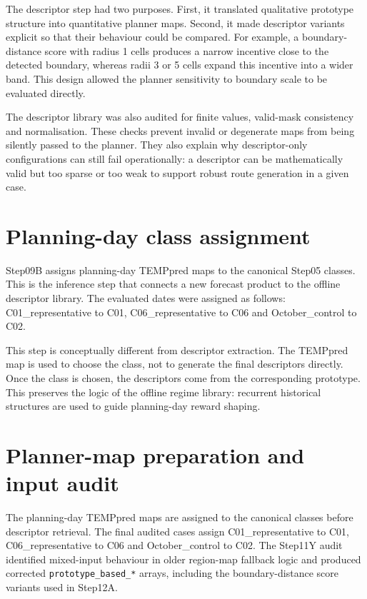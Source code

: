 The descriptor step had two purposes. First, it translated qualitative prototype structure into quantitative planner maps. Second, it made descriptor variants explicit so that their behaviour could be compared. For example, a boundary-distance score with radius 1 cells produces a narrow incentive close to the detected boundary, whereas radii 3 or 5 cells expand this incentive into a wider band. This design allowed the planner sensitivity to boundary scale to be evaluated directly.

The descriptor library was also audited for finite values, valid-mask consistency and normalisation. These checks prevent invalid or degenerate maps from being silently passed to the planner. They also explain why descriptor-only configurations can still fail operationally: a descriptor can be mathematically valid but too sparse or too weak to support robust route generation in a given case.

\section{Planning-day class assignment}

Step09B assigns planning-day TEMPpred maps to the canonical Step05 classes. This is the inference step that connects a new forecast product to the offline descriptor library. The evaluated dates were assigned as follows: C01\_representative to C01, C06\_representative to C06 and October\_control to C02.

This step is conceptually different from descriptor extraction. The TEMPpred map is used to choose the class, not to generate the final descriptors directly. Once the class is chosen, the descriptors come from the corresponding prototype. This preserves the logic of the offline regime library: recurrent historical structures are used to guide planning-day reward shaping.

\section{Planner-map preparation and input audit}

The planning-day TEMPpred maps are assigned to the canonical classes before descriptor retrieval. The final audited cases assign C01\_representative to C01, C06\_representative to C06 and October\_control to C02. The Step11Y audit identified mixed-input behaviour in older region-map fallback logic and produced corrected \texttt{prototype\_based\_*} arrays, including the boundary-distance score variants used in Step12A.

